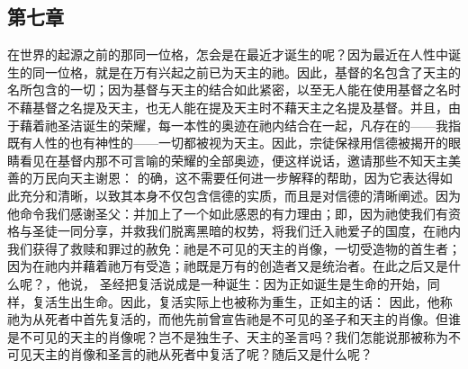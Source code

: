 
\subsection{第七章}

\par

在世界的起源之前的那同一位格，怎会是在最近才诞生的呢？因为最近在人性中诞生的同一位格，就是在万有兴起之前已为天主的祂。因此，基督的名包含了天主的名所包含的一切；因为基督与天主的结合如此紧密，以至无人能在使用基督之名时不藉基督之名提及天主，也无人能在提及天主时不藉天主之名提及基督。并且，由于藉着祂圣洁诞生的荣耀，每一本性的奥迹在祂内结合在一起，凡存在的——我指既有人性的也有神性的——一切都被视为天主。因此，宗徒保禄用信德被揭开的眼睛看见在基督内那不可言喻的荣耀的全部奥迹，便这样说话，邀请那些不知天主美善的万民向天主谢恩：  的确，这不需要任何进一步解释的帮助，因为它表达得如此充分和清晰，以致其本身不仅包含信德的实质，而且是对信德的清晰阐述。因为他命令我们感谢圣父：并加上了一个如此感恩的有力理由；即，因为祂使我们有资格与圣徒一同分享，并救我们脱离黑暗的权势，将我们迁入祂爱子的国度，在祂内我们获得了救赎和罪过的赦免：祂是不可见的天主的肖像，一切受造物的首生者；因为在祂内并藉着祂万有受造；祂既是万有的创造者又是统治者。在此之后又是什么呢？，他说， 圣经把复活说成是一种诞生：因为正如诞生是生命的开始，同样，复活生出生命。因此，复活实际上也被称为重生，正如主的话：  因此，他称祂为从死者中首先复活的，而他先前曾宣告祂是不可见的圣子和天主的肖像。但谁是不可见的天主的肖像呢？岂不是独生子、天主的圣言吗？我们怎能说那被称为不可见天主的肖像和圣言的祂从死者中复活了呢？随后又是什么呢？ 